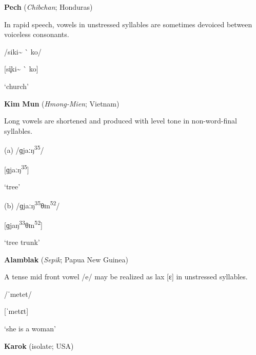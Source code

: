 \ea\label{ex:(6.6)}
   \textbf{Pech} (\textit{Chibchan}; Honduras)



In rapid speech, vowels in unstressed syllables are sometimes devoiced between voiceless consonants.



/siki\~{} \`{} ko/



[si̥ki\~{} \`{} ko]



‘church’



\citep[18]{Holt1999}

\z


\ea\label{ex:(6.7)}
   \textbf{Kim} \textbf{Mun} (\textit{Hmong-Mien}; Vietnam)



Long vowels are shortened and produced with level tone in non-word-final syllables. 



(a)  /ɡjaːŋ\textsuperscript{35}/



[ɡjaːŋ\textsuperscript{35}]



‘tree’



(b)  /ɡjaːŋ\textsuperscript{35}θɪn\textsuperscript{52}/



[ɡjaŋ\textsuperscript{33}θɪn\textsuperscript{52}]



‘tree trunk’



\citep[117]{Clark2008}

\z


\ea\label{ex:(6.8)}
  \textbf{Alamblak} (\textit{Sepik}; Papua New Guinea)



A tense mid front vowel /e/ may be realized as lax [ɛ] in unstressed syllables.



/ˈmetet/



[ˈmetɛt]



‘she is a woman’



\citep[38]{Bruce1984}

\z


\ea\label{ex:(6.9)}
   \textbf{Karok} (isolate; USA)



